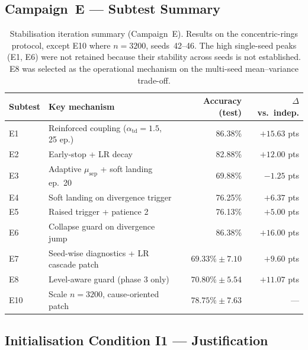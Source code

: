 \documentclass[11pt,a4paper]{article}
\begin{document}
\subsection{Campaign~E --- Subtest Summary}

\begin{table}[h]
\centering
\footnotesize
\setlength{\tabcolsep}{4pt}
\begin{tabular}{llrr}
\toprule
\textbf{Subtest} & \textbf{Key mechanism} & \textbf{Accuracy (test)} & \textbf{$\Delta$ vs.\ indep.} \\
\midrule
E1  & Reinforced coupling ($\alpha_{\mathrm{td}}=1.5$, 25 ep.) & 86.38\%            & $+15.63$ pts \\
E2  & Early-stop + LR decay                                    & 82.88\%            & $+12.00$ pts \\
E3  & Adaptive $\mu_{\mathrm{sep}}$ + soft landing ep.\ 20     & 69.88\%            & $-1.25$ pts  \\
E4  & Soft landing on divergence trigger                       & 76.25\%            & $+6.37$ pts  \\
E5  & Raised trigger + patience 2                              & 76.13\%            & $+5.00$ pts  \\
E6  & Collapse guard on divergence jump                        & 86.38\%            & $+16.00$ pts \\
E7  & Seed-wise diagnostics + LR cascade patch                 & $69.33\% \pm 7.10$ & $+9.60$ pts  \\
E8  & Level-aware guard (phase 3 only)                         & $70.80\% \pm 5.54$ & $+11.07$ pts \\
E10 & Scale $n=3200$, cause-oriented patch                     & $78.75\% \pm 7.63$ & ---          \\
\bottomrule
\end{tabular}
\caption{Stabilisation iteration summary (Campaign~E). Results on the concentric-rings
protocol, except E10 where $n=3200$, seeds~42--46. The high single-seed peaks (E1, E6)
were not retained because their stability across seeds is not established. E8 was
selected as the operational mechanism on the multi-seed mean--variance trade-off.}
\label{tab:campaign_e_detail}
\end{table}

\subsection{Initialisation Condition I1 --- Justification}
\end{document}
